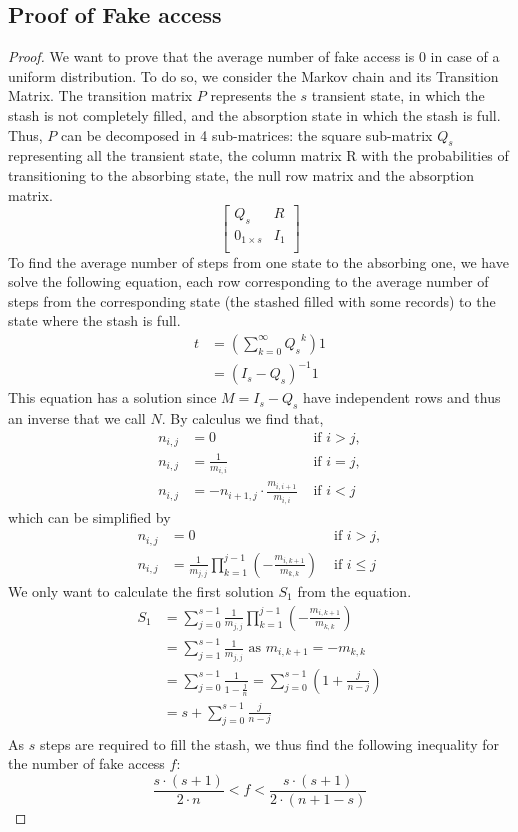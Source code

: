 \documentclass[USenglish,oneside,twocolumn]{article}
\begin{document}
\subsection{Proof of Fake access}
\begin{proof}
 We want to prove that the average number of fake access is 0 in case of a uniform distribution. To do so, we consider the Markov chain and its Transition Matrix.
 The transition matrix $P$ represents the $s$ transient state, in which the stash is not completely filled, and the absorption state in which the stash is full.
Thus, $P$ can be decomposed in 4 sub-matrices: the square sub-matrix $Q_s$ representing all the transient state, the column matrix R with the probabilities of transitioning to the absorbing state, the null row matrix and the absorption matrix.
\[
\begin{bmatrix}
   Q_s & R \\
   0_{1\times s}   & I_1 \\
\end{bmatrix}
\]
To find the average number of steps from one state to the absorbing one, we have solve the following equation, each row corresponding to the average number of steps from the corresponding state (the stashed filled with some records) to the state where the stash is full.
\begin{align*}
 t &= \left (\sum_{k=0}^{\infty} {Q_s}^k \right ) 1 \\
   &= (I_s -Q_s )^{-1} 1
\end{align*}
This equation has a solution since $M=I_s -Q_s$ have independent rows and thus an inverse that we call $N$.
By calculus we find that,
\begin{align*}
 n_{i,j} &= 0 &\text{ if } i>j,\\ 
 n_{i,j} &= \frac{1}{m_{i,i}} &\text{ if } i=j,\\
 n_{i,j} &= - n_{i+1,j } \cdot \frac{m_{i,i+1}}{m_{i,i}} &\text{ if } i<j 
\end{align*}
which can be simplified by
\begin{align*}
 n_{i,j} &= 0 &\text{ if } i>j,\\ 
 n_{i,j} &= \frac{1}{m_{j,j}} \prod_{k=1}^{j-1} \left ( - \frac{m_{i,k+1}}{m_{k,k}}\right ) &\text{ if } i\leq j
\end{align*}
We only want to calculate the first solution $S_1$ from the equation.
\begin{align*}
 S_1 &= \sum_{j=0}^{s-1} \frac{1}{m_{j,j}} \prod_{k=1}^{j-1} \left ( - \frac{m_{i,k+1}}{m_{k,k}}\right ) \\
     &= \sum_{j=1}^{s-1} \frac{1}{m_{j,j}} \text{ as } m_{i,k+1}= -m_{k,k} \\
     &= \sum_{j=0}^{s-1} \frac{1}{1-\frac{j}{n}} = \sum_{j=0}^{s-1} \left (1 + \frac{j}{n-j} \right ) \\
     &= s + \sum_{j=0}^{s-1} \frac{j}{n-j} \\   
\end{align*}
As $s$ steps are required to fill the stash, we thus find the following inequality for the number of fake access $f$:
$$ \frac{s \cdot (s+1)}{2 \cdot n} < f < \frac{s \cdot (s+1)}{2 \cdot (n+1-s)} $$
\end{proof}
\end{document}
